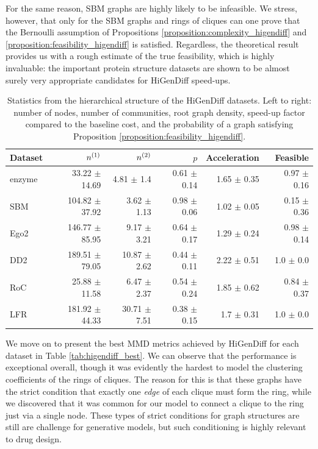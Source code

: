 For the same reason, SBM graphs are highly likely to be infeasible. We stress, however, that only for the SBM graphs and rings of cliques can one prove that the Bernoulli assumption of Propositions \ref{proposition:complexity_higendiff} and \ref{proposition:feasibility_higendiff} is satisfied. Regardless, the theoretical result provides us with a rough estimate of the true feasibility, which is highly invaluable: the important protein structure datasets are shown to be almost surely very appropriate candidates for HiGenDiff speed-ups.

\begin{table}[H]
    \centering
    \caption[Statistics from the hierarchical structure of the HiGenDiff datasets.]{Statistics from the hierarchical structure of the HiGenDiff datasets. Left to right: number of nodes, number of communities, root graph density, speed-up factor compared to the baseline cost, and the probability of a graph satisfying Proposition \ref{proposition:feasibility_higendiff}.}
    \label{tab:higendiff_datasets}
\begin{tabular}{lrrrrr}
\toprule
Dataset & $n^{\mathopen{}\left(1\right)}$ & $n^{\mathopen{}\left(2\right)}$ & $p$ & Acceleration & Feasible \\
\midrule
enzyme & 33.22 $\pm$ 14.69 & 4.81 $\pm$ 1.4 & 0.61 $\pm$ 0.14 & 1.65 $\pm$ 0.35 & 0.97 $\pm$ 0.16 \\
SBM & 104.82 $\pm$ 37.92 & 3.62 $\pm$ 1.13 & 0.98 $\pm$ 0.06 & 1.02 $\pm$ 0.05 & 0.15 $\pm$ 0.36 \\
Ego2 & 146.77 $\pm$ 85.95 & 9.17 $\pm$ 3.21 & 0.64 $\pm$ 0.17 & 1.29 $\pm$ 0.24 & 0.98 $\pm$ 0.14 \\
DD2 & 189.51 $\pm$ 79.05 & 10.87 $\pm$ 2.62 & 0.44 $\pm$ 0.11 & 2.22 $\pm$ 0.51 & 1.0 $\pm$ 0.0 \\
RoC & 25.88 $\pm$ 11.58 & 6.47 $\pm$ 2.37 & 0.54 $\pm$ 0.24 & 1.85 $\pm$ 0.62 & 0.84 $\pm$ 0.37 \\
LFR & 181.92 $\pm$ 44.33 & 30.71 $\pm$ 7.51 & 0.38 $\pm$ 0.15 & 1.7 $\pm$ 0.31 & 1.0 $\pm$ 0.0 \\
\bottomrule
\end{tabular}
\end{table}

We move on to present the best MMD metrics achieved by HiGenDiff for each dataset in Table \ref{tab:higendiff_best}. We can observe that the performance is exceptional overall, though it was evidently the hardest to model the clustering coefficients of the rings of cliques. The reason for this is that these graphs have the strict condition that exactly one \emph{edge} of each clique must form the ring, while we discovered that it was common for our model to connect a clique to the ring just via a single node. These types of strict conditions for graph structures are still are challenge for generative models, but such conditioning is highly relevant to drug design.

